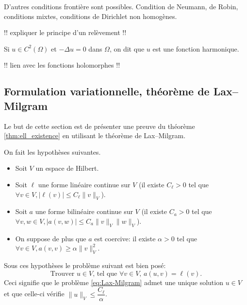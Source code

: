 \documentclass[12pt,a4paper,twoside]{article}
\begin{document}
\begin{remark}
  D'autres conditions fronti\`ere sont possibles.
  Condition de Neumann, de Robin, conditions mixtes, conditions de Dirichlet non homog\`enes.
\end{remark}

!! expliquer le principe d'un rel\`evement !!

\begin{definition}
  Si $u \in C^2(\Omega)$ et $- \Delta u = 0$ dans $\Omega$,
  on dit que $u$ est une fonction harmonique.
\end{definition}

!! lien avec les fonctions holomorphes !!

\subsection{Formulation variationnelle, th\'eor\`eme de Lax--Milgram}

Le but de cette section est de pr\'esenter une preuve du th\'eor\`eme \ref{thm:ell_existence}
en utilisant le th\'eor\`eme de Lax--Milgram.

\begin{theorem}
  \label{thm:Lax-Milgram}
  On fait les hypoth\`eses suivantes.
  \begin{itemize}
  \item Soit $V$ un espace de Hilbert.
  \item Soit $\ell$ une forme lin\'eaire continue sur $V$
    (il existe $C_{\ell} > 0$ tel que $\forall v \in V, |\ell(v)| \leq C_{\ell} \| v \|_{V}$).
  \item Soit $a$ une forme bilin\'eaire continue sur $V$
    (il existe $C_{a} > 0$ tel que $\forall v,w \in V, |a(v,w)| \leq C_{a} \| v \|_{V} \| w \|_{V}$).
  \item On suppose de plus que $a$ est coercive:
    il existe $\alpha > 0$ tel que $\forall v \in V, a(v,v) \geq \alpha \| v \|_{V}^2$.
  \end{itemize}
  Sous ces hypoth\`eses le probl\`eme suivant est bien pos\'e:
  \begin{equation}
    \label{eq:Lax-Milgram}
    \text{Trouver $u \in V$, tel que $\forall v \in V$, } a(u,v) = \ell(v) .
  \end{equation}
  Ceci signifie que le probl\`eme \eqref{eq:Lax-Milgram} admet une unique solution $u \in V$
  et que celle-ci v\'erifie $\| u \|_{V} \leq \dfrac{C_{\ell}}{\alpha}$.
\end{theorem}
\end{document}
